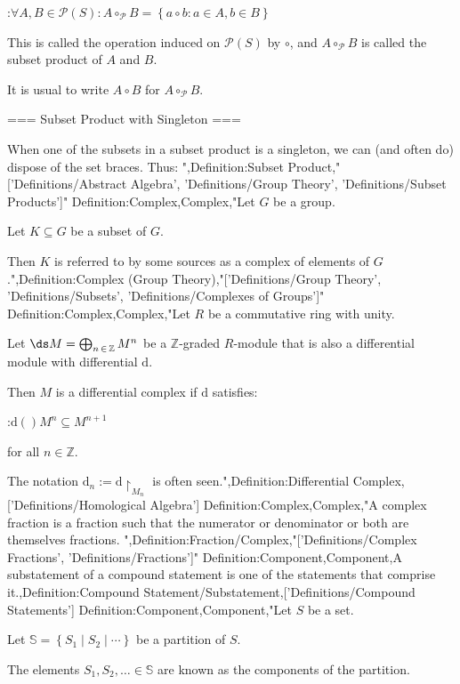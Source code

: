 :$\forall A, B \in \mathcal P \left( S \right): A \circ_\mathcal P B = \left\lbrace a \circ b: a \in A, b \in B \right\rbrace$


This is called the operation induced on $\mathcal P \left( S \right)$ by $\circ$, and $A \circ_\mathcal P B$ is called the subset product of $A$ and $B$.


It is usual to write $A \circ B$ for $A \circ_\mathcal P B$.


=== Subset Product with Singleton ===

When one of the subsets in a subset product is a singleton, we can (and often do) dispose of the set braces. Thus:
",Definition:Subset Product,"['Definitions/Abstract Algebra', 'Definitions/Group Theory', 'Definitions/Subset Products']"
Definition:Complex,Complex,"Let $G$ be a group.

Let $K \subseteq G$ be a subset of $G$.


Then $K$ is referred to by some sources as a complex of elements of $G$.",Definition:Complex (Group Theory),"['Definitions/Group Theory', 'Definitions/Subsets', 'Definitions/Complexes of Groups']"
Definition:Complex,Complex,"Let $R$ be a commutative ring with unity.

Let $\ds M = \bigoplus_{n \mathop \in \mathbb Z} M^n$ be a $\mathbb Z$-graded $R$-module that is also a differential module with differential $\mathrm d$.


Then $M$ is a differential complex if $\mathrm d$ satisfies:

:$\mathrm d \left(   \right){M^n} \subseteq M^{n + 1}$

for all $n \in \mathbb Z$.


The notation $\mathrm d_n := \mathrm d \restriction_{M_n}$ is often seen.",Definition:Differential Complex,['Definitions/Homological Algebra']
Definition:Complex,Complex,"A complex fraction is a fraction such that the numerator or denominator or both are themselves fractions.
",Definition:Fraction/Complex,"['Definitions/Complex Fractions', 'Definitions/Fractions']"
Definition:Component,Component,A substatement of a compound statement is one of the statements that comprise it.,Definition:Compound Statement/Substatement,['Definitions/Compound Statements']
Definition:Component,Component,"Let $S$ be a set.

Let $\mathbb S = \left\lbrace S_1 \mid S_2 \mid \cdots \right\rbrace$ be a partition of $S$.


The elements $S_1, S_2, \ldots \in \mathbb S$ are known as the components of the partition.


